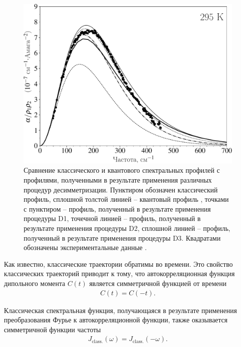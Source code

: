 \begin{figure}
    \centering
    \includegraphics[width=0.7\linewidth]{./pictures/two_atom_spectra/desymmetrizations_295K-crop.pdf}
    \caption{Сравнение классического и квантового спектральных профилей с профилями, полученными в результате применения различных процедур десимметризации. Пунктиром обозначен классический профиль, сплошной толстой линией -- квантовый профиль \cite{buryak2014}, точками с пунктиром -- профиль, полученный в результате применения процедуры D1, точечной линией -- профиль, полученный в результате применения процедуры D2, сплошной линией -- профиль, полученный в результате применения процедуры D3. Квадратами обозначены экспериментальные данные \cite{bosomworth1965_part2}.}
    \label{fig:two-atom-desymmetrizations}
\end{figure}

Как известно, классические траектории обратимы во времени. Это свойство классических траекторий приводит к тому, что автокорреляционная функция дипольного момента $C(t)$ является симметричной функцией от времени \cite{frommhold}
\begin{gather}
    C(t) = C(-t).
\end{gather}

Классическая спектральная функция, получающаяся в результате применения преобразования Фурье к автокорреляционной функции, также оказывается симметричной функции частоты 
\begin{gather}
    J_\text{class.}(\omega) = J_\text{class.}(-\omega). \label{classical-detailed-balance}
\end{gather}

